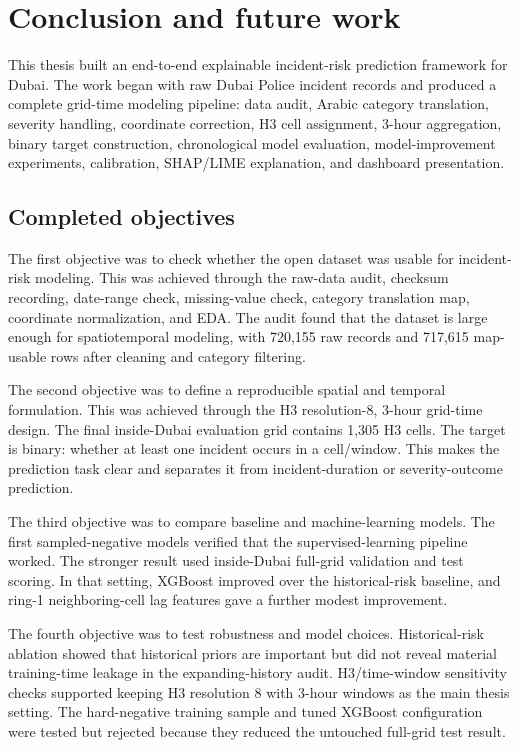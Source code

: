 \chapter{Conclusion and future work}

This thesis built an end-to-end explainable incident-risk prediction framework for Dubai. The work began with raw Dubai Police incident records and produced a complete grid-time modeling pipeline: data audit, Arabic category translation, severity handling, coordinate correction, H3 cell assignment, 3-hour aggregation, binary target construction, chronological model evaluation, model-improvement experiments, calibration, SHAP/LIME explanation, and dashboard presentation.

\section{Completed objectives}

The first objective was to check whether the open dataset was usable for incident-risk modeling. This was achieved through the raw-data audit, checksum recording, date-range check, missing-value check, category translation map, coordinate normalization, and EDA. The audit found that the dataset is large enough for spatiotemporal modeling, with 720,155 raw records and 717,615 map-usable rows after cleaning and category filtering.

The second objective was to define a reproducible spatial and temporal formulation. This was achieved through the H3 resolution-8, 3-hour grid-time design. The final inside-Dubai evaluation grid contains 1,305 H3 cells. The target is binary: whether at least one incident occurs in a cell/window. This makes the prediction task clear and separates it from incident-duration or severity-outcome prediction.

The third objective was to compare baseline and machine-learning models. The first sampled-negative models verified that the supervised-learning pipeline worked. The stronger result used inside-Dubai full-grid validation and test scoring. In that setting, XGBoost improved over the historical-risk baseline, and ring-1 neighboring-cell lag features gave a further modest improvement.

The fourth objective was to test robustness and model choices. Historical-risk ablation showed that historical priors are important but did not reveal material training-time leakage in the expanding-history audit. H3/time-window sensitivity checks supported keeping H3 resolution 8 with 3-hour windows as the main thesis setting. The hard-negative training sample and tuned XGBoost configuration were tested but rejected because they reduced the untouched full-grid test result.

